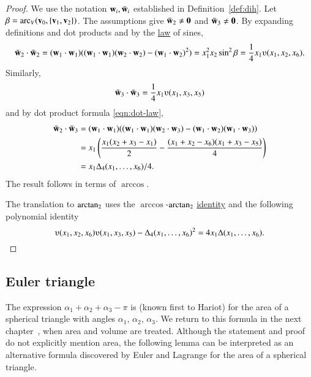 \begin{proof}  We use the notation ${\mathbf w}_i, \bar {{\mathbf w}}_i$ established in Definition~\ref{def:dih}.
  Let $\beta = \operatorname{arc}_V({\mathbf v}_0,\{{\mathbf v}_1,{\mathbf v}_2\})$.  The assumptions give
  $\bar {{\mathbf w}}_2\ne {\mathbf 0}$ and $\bar {{\mathbf w}}_3 \ne {\mathbf 0}$.  %
  By expanding definitions and dot products and by the
  \hyperref[lemma:los]{law} of sines,
\begin{displaymath}
  \bar \w_2\cdot \bar \w_2 = (\w_1\cdot \w_1) ((\w_1\cdot \w_1)(\w_2\cdot \w_2) -
  (\w_1\cdot \w_2)^2) =  x_1^2 x_2 \sin^2 \beta = \frac{1}{4}
  x_1
  \ups(x_1,x_2,x_6).
\end{displaymath}
Similarly,
\begin{displaymath}\bar \w_3 \cdot \bar \w_3 = \frac{1}{4} x_1
  \ups(x_1,x_3,x_5)\end{displaymath}
and by dot product formula \eqref{eqn:dot-law},
\begin{align*}
    \bar \w_2\cdot \bar \w_3 &= (\w_1\cdot \w_1)((\w_1\cdot \w_1)(\w_2\cdot \w_3) -
    (\w_1\cdot \w_2)(\w_1\cdot \w_3) ) \vspace{6pt} \\  
    &= x_1 \left(\frac{\displaystyle x_1 (x_2 + x_3 -
        x_1)}{2} - \frac{\displaystyle (x_1 + x_2 - x_6)(x_1 + x_3 -
        x_5)}{4} \right)\vspace{6pt}\\
&= {x_1\Delta_4(x_1,\ldots,x_6)}/{4}.
\end{align*}
The result follows in terms of $\arccos$.

The translation to ${\operatorname{arctan_2}}$ uses the $\arccos$-${\operatorname{arctan_2}}$
\hyperref[lemma:arccos-arctan]{identity} and the following polynomial
identity
\begin{displaymath}
\ups(x_1,x_2,x_6)\ups(x_1,x_3,x_5) - \Delta_4(x_1,\ldots,x_6)^2
= 4 x_1 \Delta(x_1,\ldots,x_6).
\end{displaymath}
\end{proof}

\subsection{Euler triangle}

The expression $\alpha_1+\alpha_2+\alpha_3-\pi$ is  (known first to Hariot) for the area of a spherical
triangle with angles $\alpha_1$, $\alpha_2$, $\alpha_3$.  We return to
this formula in the next chapter~, when area and
volume are treated.  Although the statement and proof do
not explicitly mention area, the following lemma can be interpreted
as an alternative formula discovered by Euler and Lagrange for the
area of a spherical triangle.
%
%
%
%
%

